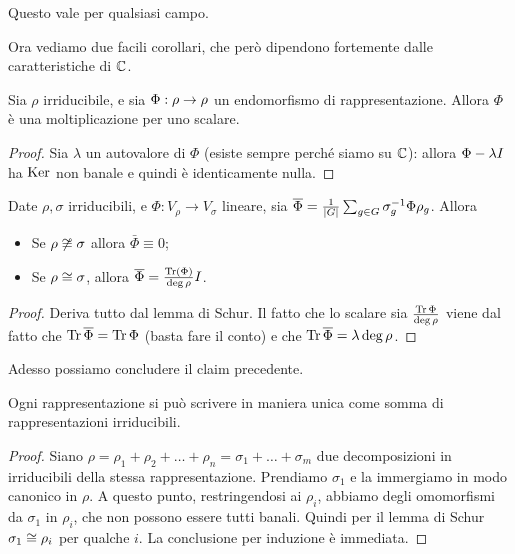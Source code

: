 	Questo vale per qualsiasi campo.
	
	Ora vediamo due facili corollari, che però dipendono fortemente dalle caratteristiche di $\mathbb C$.

	\begin{mycor}
		Sia $\rho$ irriducibile, e sia $\Phi: \rho \rightarrow \rho$ un endomorfismo di rappresentazione. Allora $\Phi$ è una moltiplicazione per uno scalare. 
	\end{mycor}
	\begin{proof}
		Sia $\lambda$ un autovalore di $\Phi$ (esiste sempre perché siamo su $\mathbb C$): allora $\Phi-\lambda I$ ha $\operatorname{Ker}$ non banale e quindi è identicamente nulla.
	\end{proof}

	\begin{mycor}
		Date $\rho,\sigma$ irriducibili, e $\Phi: V_\rho \rightarrow V_\sigma$ lineare, sia $\overline \Phi = \frac 1{\left|G\right|} \sum_{g\in G} \sigma_g^{-1} \Phi \rho_g$. Allora
		\begin{itemize}
		\item Se $\rho \not \cong \sigma$ allora $\bar \Phi\equiv 0$;
		\item Se $\rho \cong \sigma$, allora $\overline \Phi = \frac{\operatorname{Tr}(\Phi)}{\deg \rho}I$.
		\end{itemize}
	\end{mycor}
	\begin{proof}
		Deriva tutto dal lemma di Schur. Il fatto che lo scalare sia $\frac{\operatorname{Tr} \Phi}{\deg \rho}$ viene dal fatto che $\operatorname{Tr} \overline \Phi = \operatorname{Tr} \Phi$ (basta fare il conto) e che $\operatorname{Tr} \overline \Phi = \lambda \deg \rho$.
	\end{proof}

	Adesso possiamo concludere il claim precedente.
	\begin{myprop}
		Ogni rappresentazione si può scrivere in maniera unica come somma di rappresentazioni irriducibili.
	\end{myprop}
	\begin{proof}
		Siano $\rho = \rho_1 + \rho_2 + \dots + \rho_n = \sigma_1 + \dots +\sigma_m$ due decomposizioni in irriducibili della stessa rappresentazione. Prendiamo $\sigma_1$ e la immergiamo in modo canonico in $\rho$. A questo punto, restringendosi ai $\rho_i$, abbiamo degli omomorfismi da $\sigma_1$ in $\rho_i$, che non possono essere tutti banali. Quindi per il lemma di Schur $\sigma_1\cong \rho_i$ per qualche $i$. La conclusione per induzione è immediata. 
	\end{proof}

